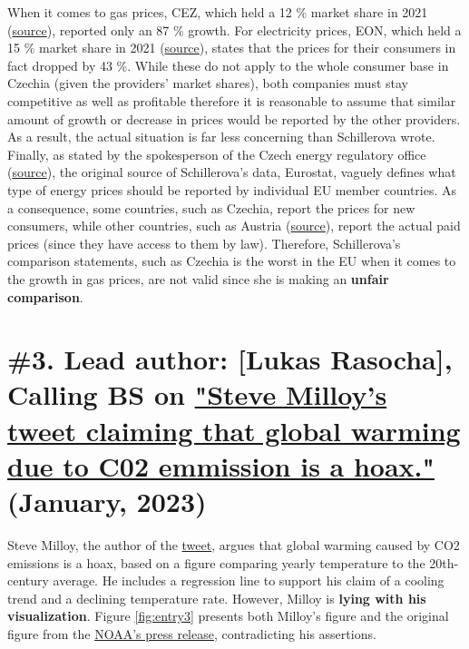 \documentclass[fleqn,12pt]{article}
\begin{document}
When it comes to gas prices, CEZ, which held a 12 \% market share in 2021 (\href{https://ekonomickydenik.cz/cez-a-innogy-posiluji-podil-na-proridlem-trhu-s-elektrinou-a-plynem/}{source}), reported only an 87 \% growth.
For electricity prices, EON, which held a 15 \% market share in 2021 (\href{https://ekonomickydenik.cz/cez-a-innogy-posiluji-podil-na-proridlem-trhu-s-elektrinou-a-plynem/}{source}), 
states that the prices for their consumers in fact dropped by 43 \%. While these do not apply to the whole 
consumer base in Czechia (given the providers' market shares), both companies must stay competitive as well as profitable therefore it is reasonable to assume that similar 
amount of growth or decrease in prices would be reported by the other providers. As a result, the actual situation is far less concerning than Schillerova wrote. 
Finally, as stated by the spokesperson of the Czech energy regulatory office 
(\href{https://www.idnes.cz/ekonomika/domaci/cena-plyn-cesko-lonsky-rust-eurostat.A230426_124224_ekonomika_vebe}{source}), 
the original source of Schillerova's data, Eurostat, vaguely defines what type of energy prices should be reported by individual EU member countries. 
As a consequence, some countries, such as Czechia, report the prices for new consumers, 
while other countries, such as Austria (\href{https://www.idnes.cz/ekonomika/domaci/eurostat-ceny-plynu-statistika-petr-fiala.A230428_162329_ekonomika_ihal}{source}), 
report the actual paid prices (since they have access to them by law). 
Therefore, Schillerova's comparison statements, such as Czechia is the worst in the EU when it comes to the growth in gas prices, are not valid since she is making an \textbf{unfair comparison}.
\newpage

\section{\#3. Lead author: [Lukas Rasocha], Calling BS on \href{https://twitter.com/JunkScience/status/1613724250011242497?s=20}{"Steve Milloy's tweet claiming that global warming due to C02 emmission is a hoax."} (January, 2023)} 

Steve Milloy, the author of the \href{https://twitter.com/JunkScience/status/1613724250011242497?s=20}{tweet}, argues that global warming caused by CO2 emissions is a hoax, 
based on a figure comparing yearly temperature to the 20th-century average. He includes a regression line to support his claim of a cooling trend and a declining temperature rate. 
However, Milloy is \textbf{lying with his visualization}. Figure \ref{fig:entry3} presents both Milloy's figure and the original figure from the \href{https://www.noaa.gov/news/2022-was-worlds-6th-warmest-year-on-record}{NOAA's press release}, 
contradicting his assertions.
\end{document}
